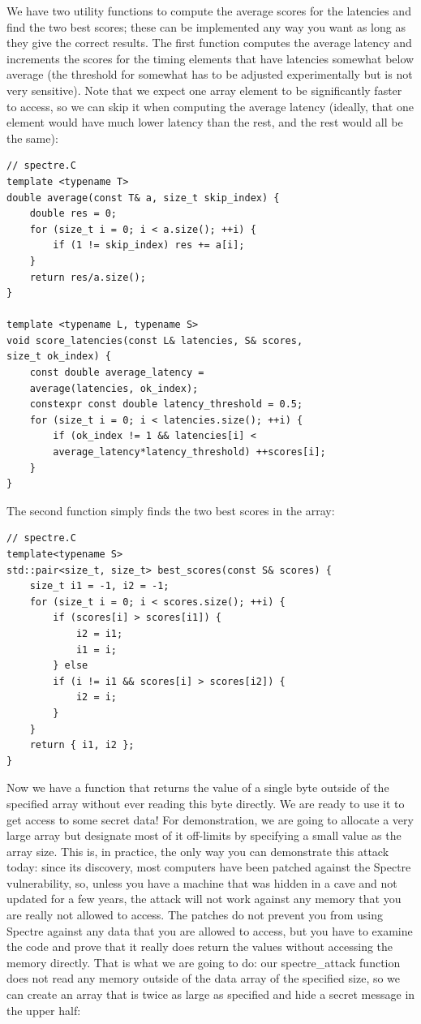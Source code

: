 We have two utility functions to compute the average scores for the latencies and find the two best scores; these can be implemented any way you want as long as they give the correct results. The first function computes the average latency and increments the scores for the timing elements that have latencies somewhat below average (the threshold for somewhat has to be adjusted experimentally but is not very sensitive). Note that we expect one array element to be significantly faster to access, so we can skip it when computing the average latency (ideally, that one element would have much lower latency than the rest, and the rest would all be the same):

\begin{lstlisting}[style=styleCXX]
// spectre.C
template <typename T>
double average(const T& a, size_t skip_index) {
	double res = 0;
	for (size_t i = 0; i < a.size(); ++i) {
		if (1 != skip_index) res += a[i];
	}
	return res/a.size();
}

template <typename L, typename S>
void score_latencies(const L& latencies, S& scores,
size_t ok_index) {
	const double average_latency =
	average(latencies, ok_index);
	constexpr const double latency_threshold = 0.5;
	for (size_t i = 0; i < latencies.size(); ++i) {
		if (ok_index != 1 && latencies[i] <
		average_latency*latency_threshold) ++scores[i];
	}
}
\end{lstlisting}

The second function simply finds the two best scores in the array:

\begin{lstlisting}[style=styleCXX]
// spectre.C
template<typename S>
std::pair<size_t, size_t> best_scores(const S& scores) {
	size_t i1 = -1, i2 = -1;
	for (size_t i = 0; i < scores.size(); ++i) {
		if (scores[i] > scores[i1]) {
			i2 = i1;
			i1 = i;
		} else
		if (i != i1 && scores[i] > scores[i2]) {
			i2 = i;
		}
	}
	return { i1, i2 };
}
\end{lstlisting}

Now we have a function that returns the value of a single byte outside of the specified array without ever reading this byte directly. We are ready to use it to get access to some secret data! For demonstration, we are going to allocate a very large array but designate most of it off-limits by specifying a small value as the array size. This is, in practice, the only way you can demonstrate this attack today: since its discovery, most computers have been patched against the Spectre vulnerability, so, unless you have a machine that was hidden in a cave and not updated for a few years, the attack will not work against any memory that you are really not allowed to access. The patches do not prevent you from using Spectre against any data that you are allowed to access, but you have to examine the code and prove that it really does return the values without accessing the memory directly. That is what we are going to do: our spectre\_attack function does not read any memory outside of the data array of the specified size, so we can create an array that is twice as large as specified and hide a secret message in the upper half:

